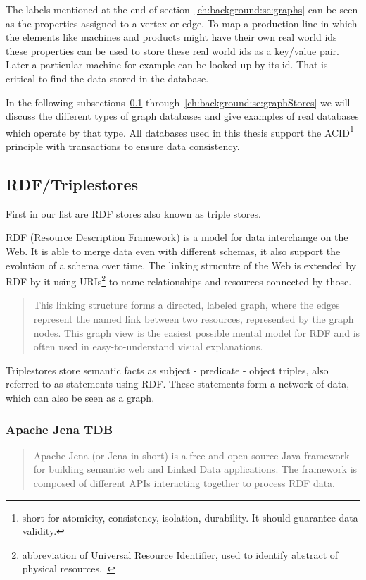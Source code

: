 The labels mentioned at the end of section~\ref{ch:background:se:graphs} can be seen as the properties assigned to a vertex or edge.
To map a production line in which the elements like machines and products might have their own real world ids these properties can be used to store these real world ids as a key/value pair.
Later a particular machine for example can be looked up by its id.
That is critical to find the data stored in the database.

In the following subsections~\ref{ch:background:se:rdfTriplestores} through~\ref{ch:background:se:graphStores} we will discuss the different types of graph databases and give examples of real databases which operate by that type.
All databases used in this thesis support the ACID\footnote{short for atomicity, consistency, isolation, durability. It should guarantee data validity.} principle with transactions to ensure data consistency.

\subsection{RDF/Triplestores}
\label{ch:background:se:rdfTriplestores}
First in our list are RDF stores also known as triple stores.

RDF (Resource Description Framework) is a model for data interchange on the Web.
It is able to merge data even with different schemas, it also support the evolution of a schema over time.
The linking strucutre of the Web is extended by RDF by it using URIs\footnote{abbreviation of Universal Resource Identifier, used to identify abstract of physical resources.~\cite{Berners-Lee2005}} to name relationships and resources connected by those.~\cite[4]{Ontotext2014}

\blockquote[\cite{W3C2014}]{This linking structure forms a directed, labeled graph, where the edges represent the named link between two resources, represented by the graph nodes.
This graph view is the easiest possible mental model for RDF and is often used in easy-to-understand visual explanations.}

Triplestores store semantic facts as subject - predicate - object triples,
also referred to as statements using RDF.
These statements form a network of data,
which can also be seen as a graph.~\cite[4]{Ontotext2014}

\subsubsection{Apache Jena TDB}
\blockquote[\cite{Apache2015}]{Apache Jena (or Jena in short) is a free and open source Java framework for building semantic web and Linked Data applications.
The framework is composed of different APIs interacting together to process RDF data.}

